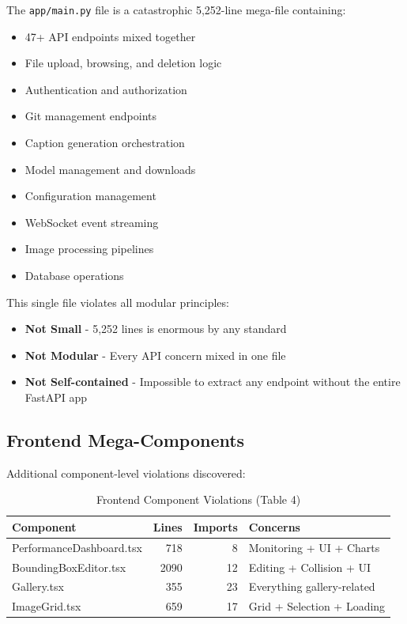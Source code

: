 \documentclass[11pt]{article}
\begin{document}
The \texttt{app/main.py} file is a catastrophic 5,252-line mega-file containing:

\begin{itemize}
\item 47+ API endpoints mixed together
\item File upload, browsing, and deletion logic
\item Authentication and authorization
\item Git management endpoints
\item Caption generation orchestration
\item Model management and downloads
\item Configuration management
\item WebSocket event streaming
\item Image processing pipelines
\item Database operations
\end{itemize}

This single file violates all modular principles:
\begin{itemize}
\item \textbf{Not Small} - 5,252 lines is enormous by any standard
\item \textbf{Not Modular} - Every API concern mixed in one file
\item \textbf{Not Self-contained} - Impossible to extract any endpoint without the entire FastAPI app
\end{itemize}

\subsection{Frontend Mega-Components}

Additional component-level violations discovered:

\begin{table}[h]
\centering
\begin{tabular}{|l|r|r|l|}
\hline
\textbf{Component} & \textbf{Lines} & \textbf{Imports} & \textbf{Concerns} \\
\hline
PerformanceDashboard.tsx & 718 & 8 & Monitoring + UI + Charts \\
BoundingBoxEditor.tsx & 2090 & 12 & Editing + Collision + UI \\
Gallery.tsx & 355 & 23 & Everything gallery-related \\
ImageGrid.tsx & 659 & 17 & Grid + Selection + Loading \\
\hline
\end{tabular}
\caption{Frontend Component Violations (Table 4)}
\end{table}
\label{table:frontend-violations}
\end{document}
